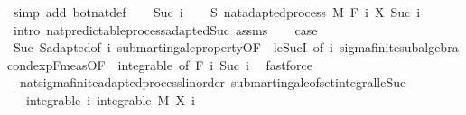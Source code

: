 \begin{isabellebody}
\ {\isacharparenleft}{\kern0pt}simp\ add{\isacharcolon}{\kern0pt}\ bot{\isacharunderscore}{\kern0pt}nat{\isacharunderscore}{\kern0pt}def{\isacharparenright}{\kern0pt}\isanewline
{}\isamarkupfalse%
\isanewline
\ \ \isamarkupfalse%
\ {\isacharparenleft}{\kern0pt}Suc\ i{\isacharparenright}{\kern0pt}\isanewline
\ \ \isamarkupfalse%
\ S{\isacharcolon}{\kern0pt}\ nat{\isacharunderscore}{\kern0pt}adapted{\isacharunderscore}{\kern0pt}process\ M\ F\ {\isachardoublequoteopen}{\isasymlambda}i{\isachardot}{\kern0pt}\ X\ {\isacharparenleft}{\kern0pt}Suc\ i{\isacharparenright}{\kern0pt}{\isachardoublequoteclose}\ \isamarkupfalse%
\ {\isacharparenleft}{\kern0pt}intro\ nat{\isacharunderscore}{\kern0pt}predictable{\isacharunderscore}{\kern0pt}process{\isachardot}{\kern0pt}adapted{\isacharunderscore}{\kern0pt}Suc\ assms{\isacharparenright}{\kern0pt}\isanewline
\ \ \isamarkupfalse%
\ {\isacharquery}{\kern0pt}case\ \isamarkupfalse%
\ Suc\ S{\isachardot}{\kern0pt}adapted{\isacharbrackleft}{\kern0pt}of\ i{\isacharbrackright}{\kern0pt}\ submartingale{\isacharunderscore}{\kern0pt}property{\isacharbrackleft}{\kern0pt}OF\ {\isacharunderscore}{\kern0pt}\ le{\isacharunderscore}{\kern0pt}SucI{\isacharcomma}{\kern0pt}\ of\ i{\isacharbrackright}{\kern0pt}\ sigma{\isacharunderscore}{\kern0pt}finite{\isacharunderscore}{\kern0pt}subalgebra{\isachardot}{\kern0pt}cond{\isacharunderscore}{\kern0pt}exp{\isacharunderscore}{\kern0pt}F{\isacharunderscore}{\kern0pt}meas{\isacharbrackleft}{\kern0pt}OF\ {\isacharunderscore}{\kern0pt}\ integrable{\isacharcomma}{\kern0pt}\ of\ {\isachardoublequoteopen}F\ i{\isachardoublequoteclose}\ {\isachardoublequoteopen}Suc\ i{\isachardoublequoteclose}{\isacharbrackright}{\kern0pt}\ \isamarkupfalse%
\ fastforce\isanewline
{}\isamarkupfalse%
%
\endisatagproof
{\isafoldproof}%
%
\isadelimproof
\isanewline
%
\endisadelimproof
\isanewline
{}\isamarkupfalse%
\ {\isacharparenleft}{\kern0pt}\ nat{\isacharunderscore}{\kern0pt}sigma{\isacharunderscore}{\kern0pt}finite{\isacharunderscore}{\kern0pt}adapted{\isacharunderscore}{\kern0pt}process{\isacharunderscore}{\kern0pt}linorder{\isacharparenright}{\kern0pt}\ submartingale{\isacharunderscore}{\kern0pt}of{\isacharunderscore}{\kern0pt}set{\isacharunderscore}{\kern0pt}integral{\isacharunderscore}{\kern0pt}le{\isacharunderscore}{\kern0pt}Suc{\isacharcolon}{\kern0pt}\isanewline
\ \ \ integrable{\isacharcolon}{\kern0pt}\ {\isachardoublequoteopen}{\isasymAnd}i{\isachardot}{\kern0pt}\ integrable\ M\ {\isacharparenleft}{\kern0pt}X\ i{\isacharparenright}{\kern0pt}{\isachardoublequoteclose}\ \isanewline

\end{isabellebody}

